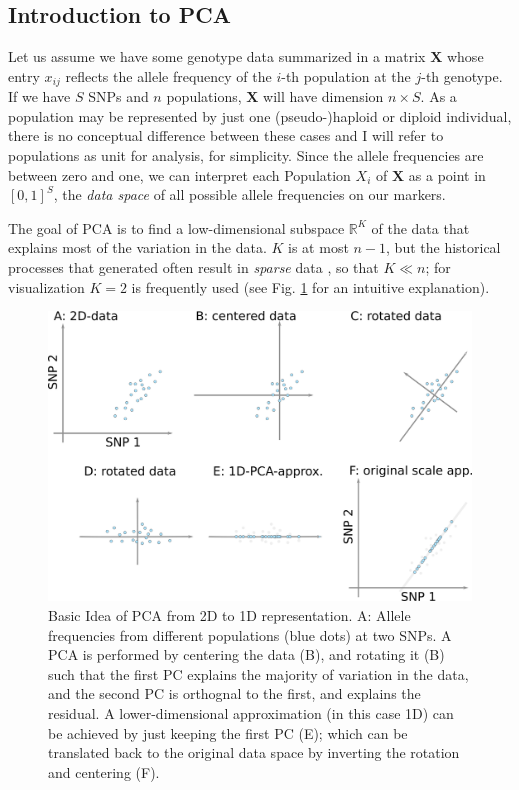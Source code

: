 \documentclass[12pt,a4pape, fullpage]{article}
\newcommand{\MX}{\mathbf{X}} %
\begin{document}
\subsection{Introduction to PCA}
Let us assume we have some genotype data summarized in a matrix $\MX$ whose entry $x_{ij}$ reflects the allele frequency of the $i$-th population at the $j$-th genotype. If we have $S$ SNPs and $n$ populations, $\MX$ will have dimension $n \times S$. As a population may be represented by just one (pseudo-)haploid or diploid individual, there is no conceptual difference between these cases and I will
refer to populations as unit for analysis, for simplicity. Since the allele
frequencies are between zero and one, we can interpret each Population $X_i$
of $\MX$ as a point in $[0, 1]^S$, the \emph{data space} of all possible allele frequencies on our markers.
	
The goal of PCA is to find a low-dimensional subspace $\mathbb{R}^K$ of the data that explains most of the variation in the data. $K$ is at most $n-1$, but the historical processes that generated often result in \emph{sparse} data \citep{engelhardt2010,
patterson2012}, so that $K \ll n$; for visualization $K=2$ is frequently used (see Fig. \ref{fig:pca_explanation} for an intuitive explanation). 
	
	\begin{figure}
		\includegraphics[width=\textwidth]{pca_explanation.png}
		\caption{Basic Idea of PCA from 2D to 1D representation. A: Allele frequencies from different populations (blue dots) at two SNPs. A PCA is performed by centering the data (B), and rotating it (B) such that the first PC explains the majority of variation in the data, and the second PC is orthognal to the first, and explains the residual. A lower-dimensional approximation (in this case 1D) can be achieved by just keeping the first PC (E); which can be translated back to the original data space by inverting the rotation and centering (F).}
		\label{fig:pca_explanation}
	\end{figure}
	
\end{document}
